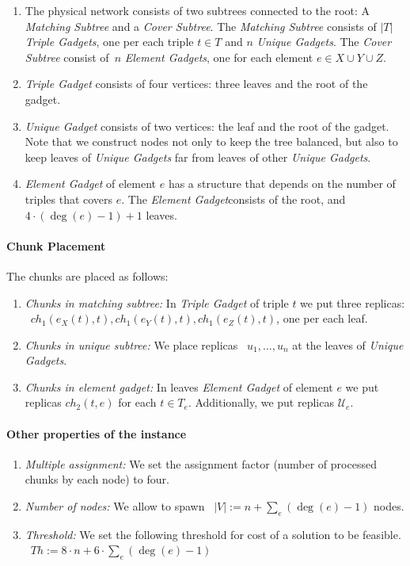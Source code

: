 \documentclass[preprint,12pt]{elsarticle}
\newcommand{\numNodes}{\ensuremath{|V|}}
\newcommand{\MatchSubtree}{{\emph{Matching Subtree}}}
\newcommand{\CoverSubtree}{{\emph{Cover Subtree}}}
\newcommand{\TripleGadget}{{\emph{Triple Gadget}}}
\newcommand{\TripleGadgets}{{\emph{Triple Gadgets}}}
\newcommand{\UnqGadget}{{\emph{Unique Gadget}}}
\newcommand{\UnqGadgets}{{\emph{Unique Gadgets}}}
\newcommand{\ElGadget}{{\emph{Element Gadget}}}
\newcommand{\ElGadgets}{{\emph{Element Gadgets}}}
\newcommand{\UniqueE}{{\ensuremath{\mathcal{U}_e}}}
\newcommand{\Thr}{\ensuremath{Th}}
\begin{document}
\begin{enumerate}
  \item The physical network consists of two subtrees connected to the
  root: A {\MatchSubtree} and a {\CoverSubtree}. The
  {\MatchSubtree} consists of $|T|$ {\TripleGadgets}, one per each triple $t\in T$ and $n$
  {\UnqGadgets}. The {\CoverSubtree} consist of~$n$ {\ElGadgets}, one for each element $e\in X\cup Y\cup Z$.
  \item {\TripleGadget} consists of four vertices: three leaves and the root of the gadget.
  \item {\UnqGadget} consists of two vertices: the leaf and the root of the gadget. Note that we construct
  nodes not only to keep the tree balanced, but also to keep leaves of
  {\UnqGadgets} far from leaves of other \UnqGadgets.
  \item {\ElGadget} of element $e$ has a structure that depends on the number of triples that covers $e$. The \ElGadget consists of the
  root, and~$4\cdot(\deg(e)-1)+1$ leaves.
\end{enumerate}

\paragraph{Chunk Placement}
The chunks are placed as follows:
\begin{enumerate}
  \item \emph{Chunks in matching subtree:} In {\TripleGadget} of triple $t$ we put
  three replicas:
 ~$ch_1(e_X(t), t), ch_1(e_Y(t), t), ch_1(e_Z(t), t)$, one per each leaf.
  \item \emph{Chunks in unique subtree:} We place replicas
 ~$u_1,\ldots, u_n$ at the leaves of \UnqGadgets.
 \item \emph{Chunks in element gadget:} In leaves {\ElGadget} of element $e$ we put replicas $ch_2(t, e)$ for each $t \in T_e$. Additionally, we put replicas $\UniqueE$.
\end{enumerate}

\paragraph{Other properties of the instance}
\begin{enumerate}
  \item \emph{Multiple assignment:} We set the assignment factor (number of processed
  chunks by each node) to four.
  \item \emph{Number of nodes:} We allow to spawn
 ~$\numNodes := n + \sum_{e}(\deg(e)-1)$ nodes.
  \item \emph{Threshold:} We set the following threshold for cost of a solution to be feasible.
 ~$\Thr := 8\cdot n + 6\cdot\sum_{e}(\deg(e)-1)$
\end{enumerate}
\end{document}
